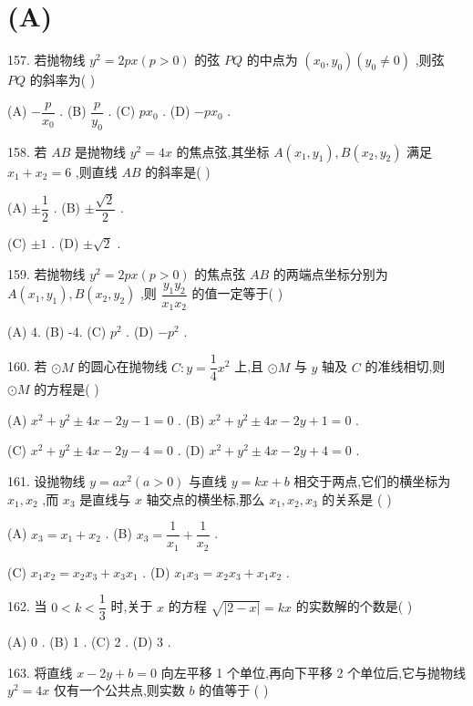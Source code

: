 \section*{(A)}

157. 若抛物线 ${y}^{2} = {2px}\left( {p > 0}\right)$ 的弦 ${PQ}$ 的中点为 $\left( {{x}_{0},{y}_{0}}\right) \left( {{y}_{0} \neq  0}\right)$ ,则弦 ${PQ}$ 的斜率为(   )

(A) $- \dfrac{p}{{x}_{0}}$ . (B) $\dfrac{p}{{y}_{0}}$ . (C) $p{x}_{0}$ . (D) $- p{x}_{0}$ .

158. 若 ${AB}$ 是抛物线 ${y}^{2} = {4x}$ 的焦点弦,其坐标 $A\left( {{x}_{1},{y}_{1}}\right) ,B\left( {{x}_{2},{y}_{2}}\right)$ 满足 ${x}_{1} + {x}_{2} = 6$ ,则直线 ${AB}$ 的斜率是(   )

(A) $\pm  \dfrac{1}{2}$ . (B) $\pm  \dfrac{\sqrt{2}}{2}$ .

(C) $\pm  1$ . (D) $\pm  \sqrt{2}$ .

159. 若抛物线 ${y}^{2} = {2px}\left( {p > 0}\right)$ 的焦点弦 ${AB}$ 的两端点坐标分别为 $A\left( {{x}_{1},{y}_{1}}\right) ,B\left( {{x}_{2},{y}_{2}}\right)$ ,则 $\dfrac{{y}_{1}{y}_{2}}{{x}_{1}{x}_{2}}$ 的值一定等于(   )

(A) 4. (B) -4. (C) ${p}^{2}$ . (D) $- {p}^{2}$ .

160. 若 $\odot  M$ 的圆心在抛物线 $C : y = \dfrac{1}{4}{x}^{2}$ 上,且 $\odot  M$ 与 $y$ 轴及 $C$ 的准线相切,则 $\odot  M$ 的方程是(   )

(A) ${x}^{2} + {y}^{2} \pm  {4x} - {2y} - 1 = 0$ . (B) ${x}^{2} + {y}^{2} \pm  {4x} - {2y} + 1 = 0$ .

(C) ${x}^{2} + {y}^{2} \pm  {4x} - {2y} - 4 = 0$ . (D) ${x}^{2} + {y}^{2} \pm  {4x} - {2y} + 4 = 0$ .

161. 设抛物线 $y = a{x}^{2}\left( {a > 0}\right)$ 与直线 $y = {kx} + b$ 相交于两点,它们的横坐标为 ${x}_{1},{x}_{2}$ ,而 ${x}_{3}$ 是直线与 $x$ 轴交点的横坐标,那么 ${x}_{1},{x}_{2},{x}_{3}$ 的关系是 (   )

(A) ${x}_{3} = {x}_{1} + {x}_{2}$ . (B) ${x}_{3} = \dfrac{1}{{x}_{1}} + \dfrac{1}{{x}_{2}}$ .

(C) ${x}_{1}{x}_{2} = {x}_{2}{x}_{3} + {x}_{3}{x}_{1}$ . (D) ${x}_{1}{x}_{3} = {x}_{2}{x}_{3} + {x}_{1}{x}_{2}$ .

162. 当 $0 < k < \dfrac{1}{3}$ 时,关于 $x$ 的方程 $\sqrt{\left| 2 - x\right| } = {kx}$ 的实数解的个数是(   )

(A) 0 . (B) 1 . (C) 2 . (D) 3 .

163. 将直线 $x - {2y} + b = 0$ 向左平移 1 个单位,再向下平移 2 个单位后,它与抛物线 ${y}^{2} = {4x}$ 仅有一个公共点,则实数 $b$ 的值等于 (   )

